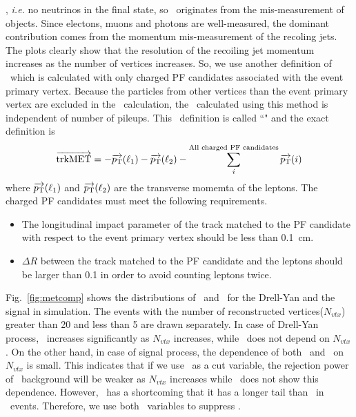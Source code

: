 \met, \textit{i.e.} no neutrinos in the final state, so \met\ originates from 
the mis-measurement of objects. Since electons, muons 
and photons are well-measured, the dominant contribution comes from the momentum 
mis-measurement of the recoling jets. The plots clearly show that the resolution 
of the recoiling jet momentum increases as the number of vertices increases.   
So, we use another definition of \met\ which is calculated with only charged 
PF candidates associated with the event primary vertex. Because the particles from 
other vertices than the event primary vertex are excluded in the \met\ calculation,
the \met\ calculated using this method is independent of number of pileups.  
This \met\ definition is called ``\trkmet" and the exact definition is
\begin{eqnarray} 
\overrightarrow{\mathrm{trkMET}} 
= 
- \overrightarrow{p_\mathrm{T}} (\ell_1)  
- \overrightarrow{p_\mathrm{T}} (\ell_2)  
- \sum^{\textrm{All charged PF candidates}}_i \overrightarrow{p_\mathrm{T}}(i)
\end{eqnarray} 
where $\overrightarrow{p_\mathrm{T}} (\ell_1)$ and $\overrightarrow{p_\mathrm{T}} (\ell_2)$
are the transverse momemta of the leptons. The charged PF candidates must 
meet the following requirements.
\begin{itemize}
\item The longitudinal impact parameter of the track matched to the PF candidate 
      with respect to the event primary vertex should be less than 0.1~cm. 
\item $\Delta R$ between the track matched to the PF candidate and the leptons 
      should be larger than 0.1 in order to avoid counting leptons twice. 
\end{itemize}

Fig.~\ref{fig:metcomp} shows the distributions of \pfmet\ and \trkmet\ 
for the Drell-Yan and the signal in simulation. The events with the number 
of reconstructed vertices($N_{vtx}$) greater than 20 and less than 5 
are drawn separately. In case of Drell-Yan process, \pfmet\ increases 
significantly as $N_{vtx}$ increases, while \trkmet\ does not depend 
on $N_{vtx}$. 
On the other hand, in case of signal process, the dependence 
of both \pfmet\ and \trkmet\ on $N_{vtx}$ is small. 
This indicates that if we use \pfmet\ as a cut variable, 
the rejection power of \dyll\ background will be weaker 
as $N_{vtx}$ increases while \trkmet\ does not show this 
dependence. However, \trkmet\ has a shortcoming that it has 
a longer tail than \pfmet\ in \dyll\ events. 
Therefore, we use both \met\ variables to suppress \dyll.

